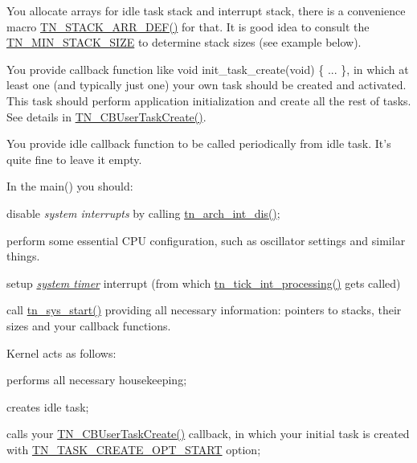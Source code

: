 \begin{DoxyItemize}
\item You allocate arrays for idle task stack and interrupt stack, there is a convenience macro {\ttfamily \hyperlink{tn__sys_8h_ad61af0f0e9ab96bdf1ac1bf1e03e3c75}{T\+N\+\_\+\+S\+T\+A\+C\+K\+\_\+\+A\+R\+R\+\_\+\+D\+E\+F()}} for that. It is good idea to consult the {\ttfamily \hyperlink{tn__arch__example_8h_ad465f81e8ea15a530747b1147dbe4605}{T\+N\+\_\+\+M\+I\+N\+\_\+\+S\+T\+A\+C\+K\+\_\+\+S\+I\+Z\+E}} to determine stack sizes (see example below).
\item You provide callback function like {\ttfamily void init\+\_\+task\+\_\+create(void) \{ ... \}}, in which at least one (and typically just one) your own task should be created and activated. This task should perform application initialization and create all the rest of tasks. See details in {\ttfamily \hyperlink{tn__sys_8h_a94f785ff88dfca8746f34de59784883d}{T\+N\+\_\+\+C\+B\+User\+Task\+Create()}}.
\item You provide idle callback function to be called periodically from idle task. It's quite fine to leave it empty.
\item In the {\ttfamily main()} you should\+:
\begin{DoxyItemize}
\item disable {\itshape system interrupts} by calling {\ttfamily \hyperlink{tn__arch_8h_a2b3f2294ac42a599662c573394b14c75}{tn\+\_\+arch\+\_\+int\+\_\+dis()}};
\item perform some essential C\+P\+U configuration, such as oscillator settings and similar things.
\item setup {\itshape \hyperlink{time_ticks}{system timer}} interrupt (from which {\ttfamily \hyperlink{tn__sys_8h_aa44d297639e0520420890ef2bb7e2c1c}{tn\+\_\+tick\+\_\+int\+\_\+processing()}} gets called)
\item call {\ttfamily \hyperlink{tn__sys_8h_a62ab25d9d8ca01c02d368968f19e49bf}{tn\+\_\+sys\+\_\+start()}} providing all necessary information\+: pointers to stacks, their sizes and your callback functions.
\end{DoxyItemize}
\item Kernel acts as follows\+:
\begin{DoxyItemize}
\item performs all necessary housekeeping;
\item creates idle task;
\item calls your {\ttfamily \hyperlink{tn__sys_8h_a94f785ff88dfca8746f34de59784883d}{T\+N\+\_\+\+C\+B\+User\+Task\+Create()}} callback, in which your initial task is created with {\ttfamily \hyperlink{tn__tasks_8h_a8fa2ef577d6bd159b3fae559839f98d5a0c9352496e4465eb7e1b29dab7544acc}{T\+N\+\_\+\+T\+A\+S\+K\+\_\+\+C\+R\+E\+A\+T\+E\+\_\+\+O\+P\+T\+\_\+\+S\+T\+A\+R\+T}} option;

\end{DoxyItemize}
\end{DoxyItemize}
